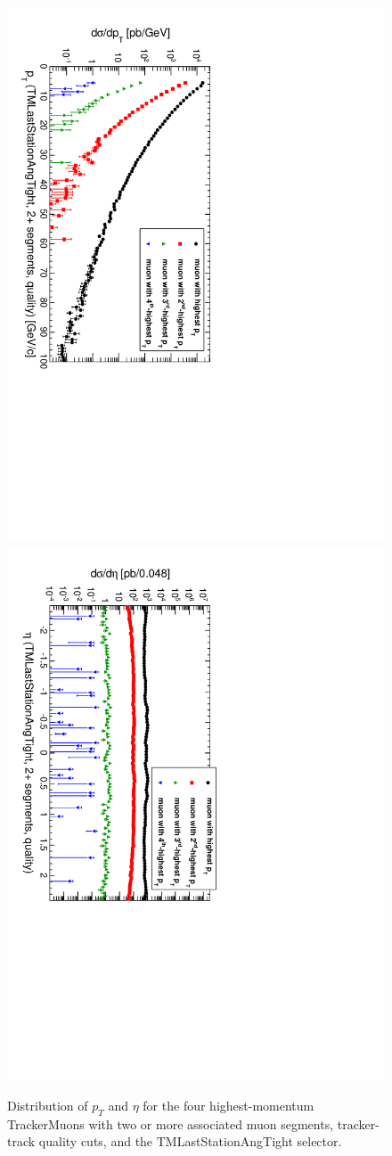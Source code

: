 \documentclass[12pt]{article}
\begin{document}
\begin{figure}
\includegraphics[height=0.5\linewidth, angle=90]{fig/backgroundsMatching_plot/ptcurves_TwoChambersGoodTrackerLastAng.pdf}
\includegraphics[height=0.5\linewidth, angle=90]{fig/backgroundsMatching_plot/etacurves_TwoChambersGoodTrackerLastAng.pdf}

\caption{Distribution of $p_T$ and $\eta$ for the four highest-momentum TrackerMuons with two or more associated muon segments, tracker-track quality cuts, and the TMLastStationAngTight selector. \label{fig:curves_TwoChambersGoodTrackerLastAng}}
\end{figure}
\end{document}

